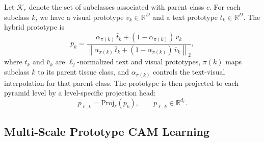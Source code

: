 Let $\mathcal{K}_c$ denote the set of subclasses associated with parent class $c$. For each subclass $k$, we have a visual prototype $v_k \in \mathbb{R}^{D}$ and a text prototype $t_k \in \mathbb{R}^{D}$. The hybrid prototype is
\begin{equation}
    p_k =
    \frac{
        \alpha_{\pi(k)} \, \bar{t}_k +
        (1-\alpha_{\pi(k)}) \, \bar{v}_k
    }{
        \left\|
        \alpha_{\pi(k)} \, \bar{t}_k +
        (1-\alpha_{\pi(k)}) \, \bar{v}_k
        \right\|_2
    },
    \label{eq:hybrid_proto}
\end{equation}
where $\bar{t}_k$ and $\bar{v}_k$ are $\ell_2$-normalized text and visual prototypes, $\pi(k)$ maps subclass $k$ to its parent tissue class, and $\alpha_{\pi(k)}$ controls the text-visual interpolation for that parent class. The prototype is then projected to each pyramid level by a level-specific projection head:
\begin{equation}
    p_{\ell,k} = \mathrm{Proj}_{\ell}(p_k), \qquad
    p_{\ell,k} \in \mathbb{R}^{d_{\ell}} .
\end{equation}

\subsection{Multi-Scale Prototype CAM Learning}
\label{subsec:cam_learning}

